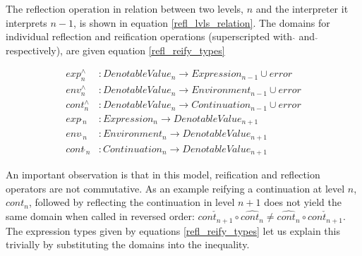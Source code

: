 \documentclass{article}
\theoremstyle{definition}
\begin{document}
The reflection operation in relation between two levels, $n$ and the interpreter it interprets $n-1$, is shown in equation \ref{refl_lvls_relation}. The domains for individual reflection and reification operations (superscripted with $\hat{}$ and $\check{}$ respectively), are given equation \ref{refl_reify_types}

\begin{equation}
	\begin{split}
		exp^\wedge_n & : DenotableValue_n \rightarrow Expression_{n-1} \cup {error}		\\
		env^\wedge_n & : DenotableValue_n \rightarrow Environment_{n-1} \cup {error}	\\
		cont^\wedge_n & : DenotableValue_n \rightarrow Continuation_{n-1} \cup {error} 	\\
		exp\,\check{}_{n} & : Expression_{n} \rightarrow DenotableValue_{n+1}			\\
		env\,\check{}_{n} & : Environment_{n} \rightarrow DenotableValue_{n+1}			\\
		cont\,\check{}_{n} & : Continuation_{n} \rightarrow DenotableValue_{n+1}		\label{refl_reify_types}
	\end{split}
\end{equation}

An important observation is that in this model, reification and reflection operators are not commutative. As an example reifying a continuation at level $n$, $cont_n$, followed by reflecting the continuation in level $n+1$ does not yield the same domain when called in reversed order: $\check{cont_{n+1}} \circ \hat{cont_n} \neq \hat{cont_n} \circ \check{cont_{n+1}}$. The expression types given by equations \ref{refl_reify_types} let us explain this trivially by substituting the domains into the inequality.

%
%
\end{document}
